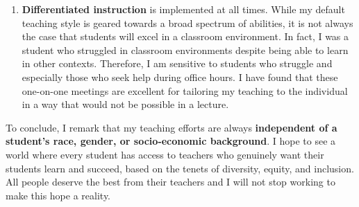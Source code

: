 \documentclass[a4paper,11pt]{article}
\begin{document}
\begin{enumerate}
		\item \textbf{Differentiated instruction} is implemented at all times. While my default teaching style is geared towards a broad spectrum of abilities, it is not always the case that students will excel in a classroom environment. In fact, I was a student who struggled in classroom environments despite being able to learn in other contexts. Therefore, I am sensitive to students who struggle and especially those who seek help during office hours. I have found that these one-on-one meetings are excellent for tailoring my teaching to the individual in a way that would not be possible in a lecture. %
	\end{enumerate}
	
	To conclude, I remark that my teaching efforts are always \textbf{independent of a student's race, gender, or socio-economic background}. I hope to see a world where every student has access to teachers who genuinely want their students learn and succeed, based on the tenets of diversity, equity, and inclusion. All people deserve the best from their teachers and I will not stop working to make this hope a reality.
	
\end{document}
